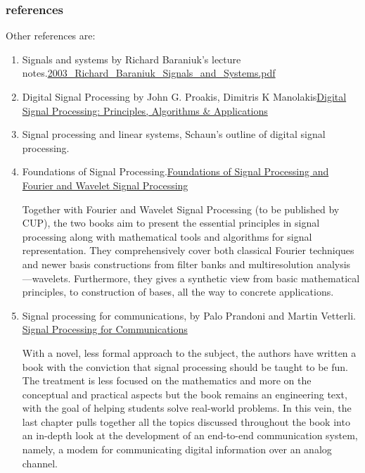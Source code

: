 \documentclass[koma,utopia,letterpaper,captions=tableheading,11pt,listings-sv,microtype,paralist,colorlinks=true,urlcolor=blue]{org-article}
\begin{document}
\subsubsection{references}
\label{sec:orgbf8c476}


Other references are:
\begin{enumerate}
\item Signals and systems by Richard Baraniuk's lecture
notes.\href{https://web.itu.edu.tr/hulyayalcin/Signal\_Processing\_Books/2003\_Richard\_Baraniuk\_Signals\_and\_Systems.pdf}{2003\_Richard\_Baraniuk\_Signals\_and\_Systems.pdf}
\item Digital Signal Processing by John G. Proakis, Dimitris K Manolakis\href{https://engineering.purdue.edu/\~ee538/DSP\_Text\_3rdEdition.pdf}{Digital Signal Processing: Principles, Algorithms \& Applications}

\item Signal processing and linear systems, Schaun's outline of digital signal
processing.
\item Foundations of Signal Processing.\href{http://fourierandwavelets.org/}{Foundations of Signal Processing and Fourier
and Wavelet Signal Processing}

Together with Fourier and Wavelet Signal Processing (to be published by CUP),
the two books aim to present the essential principles in signal processing
along with mathematical tools and algorithms for signal representation. They
comprehensively cover both classical Fourier techniques and newer basis
constructions from filter banks and multiresolution analysis—wavelets.
Furthermore, they gives a synthetic view from basic mathematical principles,
to construction of bases, all the way to concrete applications.

\item Signal processing for communications, by Palo Prandoni and Martin
Vetterli. \href{https://www.sp4comm.org/index.html}{Signal Processing for Communications}

With a novel, less formal approach to the subject, the authors have written a
book with the conviction that signal processing should be taught to be fun.
The treatment is less focused on the mathematics and more on the conceptual
and practical aspects but the book remains an engineering text, with the goal
of helping students solve real-world problems. In this vein, the last chapter
pulls together all the topics discussed throughout the book into an in-depth
look at the development of an end-to-end communication system, namely, a
modem for communicating digital information over an analog channel.


\end{enumerate}
\end{document}
